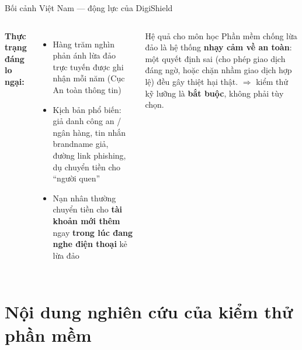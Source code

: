 \documentclass[aspectratio=169,12pt]{beamer}
\begin{document}
\begin{frame}{Bối cảnh Việt Nam --- động lực của DigiShield}
  \vspace*{-0.3em}
  \begin{columns}
    \textbf{Thực trạng đáng lo ngại:}
    \begin{itemize}
      \item Hàng trăm nghìn phản ánh lừa đảo trực tuyến được ghi nhận mỗi năm
            (Cục An toàn thông tin)
      \item Kịch bản phổ biến: giả danh công an / ngân hàng, tin nhắn brandname
            giả, đường link phishing, dụ chuyển tiền cho ``người quen''
      \item Nạn nhân thường chuyển tiền cho \textbf{tài khoản mới thêm} ngay
            \textbf{trong lúc đang nghe điện thoại} kẻ lừa đảo
    \end{itemize}

    \begin{block}{Hệ quả cho môn học}
      Phần mềm chống lừa đảo là hệ thống \textbf{nhạy cảm về an toàn}:
      một quyết định sai (cho phép giao dịch đáng ngờ, hoặc chặn nhầm
      giao dịch hợp lệ) đều gây thiệt hại thật.
      $\Rightarrow$ kiểm thử kỹ lưỡng là \textbf{bắt buộc}, không phải tùy chọn.
    \end{block}
  \end{columns}
\end{frame}

\section{Nội dung nghiên cứu của kiểm thử phần mềm}
\end{document}
